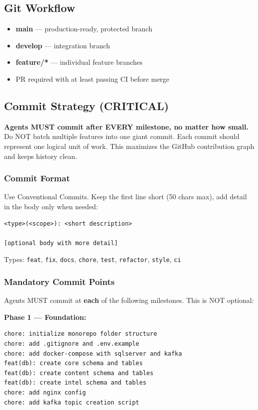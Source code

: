 \documentclass[12pt,letterpaper]{article}
\begin{document}
\subsection{Git Workflow}
\begin{itemize}
  \item \textbf{main} --- production-ready, protected branch
  \item \textbf{develop} --- integration branch
  \item \textbf{feature/*} --- individual feature branches
  \item PR required with at least passing CI before merge
\end{itemize}

\subsection{Commit Strategy (CRITICAL)}
\textbf{Agents MUST commit after EVERY milestone, no matter how small.} Do NOT batch multiple features into one giant commit. Each commit should represent one logical unit of work. This maximizes the GitHub contribution graph and keeps history clean.

\subsubsection{Commit Format}
Use Conventional Commits. Keep the first line short (50 chars max), add detail in the body only when needed:
\begin{lstlisting}[style=code]
<type>(<scope>): <short description>

[optional body with more detail]
\end{lstlisting}

Types: \texttt{feat}, \texttt{fix}, \texttt{docs}, \texttt{chore}, \texttt{test}, \texttt{refactor}, \texttt{style}, \texttt{ci}

\subsubsection{Mandatory Commit Points}
Agents MUST commit at \textbf{each} of the following milestones. This is NOT optional:

\textbf{Phase 1 --- Foundation:}
\begin{lstlisting}[style=code]
chore: initialize monorepo folder structure
chore: add .gitignore and .env.example
chore: add docker-compose with sqlserver and kafka
feat(db): create core schema and tables
feat(db): create content schema and tables
feat(db): create intel schema and tables
chore: add nginx config
chore: add kafka topic creation script
\end{lstlisting}
\end{document}
